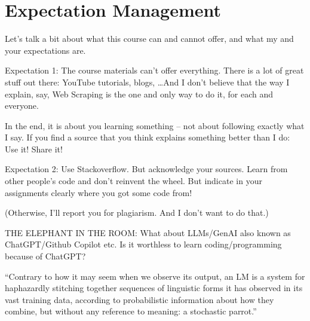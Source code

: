 \documentclass[compress]{beamer}
\begin{document}
\section{Expectation Management}


\begin{frame}[standout]
	Let's talk a bit about what this course can and cannot offer, and what my and your expectations are.
\end{frame}


\begin{frame}{Expectation 1: The course materials can't offer everything.}
There is a lot of great stuff out there: YouTube tutorials, blogs, \ldots And I don't believe that the way I explain, say, Web Scraping is the one and only way to do it, for each and everyone.

In the end, it is about you learning something -- not about following exactly what I say. If you find a source that you think explains something better than I do: Use it! Share it!
\end{frame}



\begin{frame}{Expectation 2: Use Stackoverflow. But acknowledge your sources.}
Learn from other people's code and don't reinvent the wheel. But indicate in your assignments clearly where you got some code from! 

(Otherwise, I'll report you for plagiarism. And I don't want to do that.)
\end{frame}


\begin{frame}[standout]
THE ELEPHANT IN THE ROOM: What about LLMs/GenAI also known as ChatGPT/Github Copilot etc. Is it worthless to learn coding/programming because of ChatGPT?
\end{frame}

\begin{frame}
	\begin{block}{\textcite{Bender2021}}
		``Contrary to how it may seem when we observe its output, an LM is a system for haphazardly stitching together sequences of linguistic forms it has observed in its vast training data, according to probabilistic information about how they combine, but without any reference to meaning: a stochastic parrot.''
	\end{block}
\end{frame}
\end{document}
